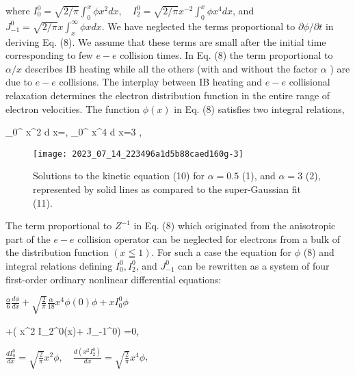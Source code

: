\documentclass[oneside,onecolumn]{article}
\begin{document}
\begin{sloppypar}
 where $I_{0}^{0}=\sqrt{2 / \pi} \int_{0}^{x} \phi x^{2} d x, \quad I_{2}^{0}=\sqrt{2 / \pi} x^{-2} \int_{0}^{x} \phi x^{4} d x$, and $J_{-1}^{0}=\sqrt{2 / \pi} x \int_{x}^{\infty} \phi x d x$. We have neglected the terms proportional to $\partial \phi / \partial t$ in deriving Eq. (8). We assume that these terms are small after the initial time corresponding to few $e-e$ collision times. In Eq. (8) the term proportional to $\alpha / x$ describes IB heating while all the others (with and without the factor $\alpha$ ) are due to $e-e$ collisions. The interplay between IB heating and $e-e$ collisional relaxation determines the electron distribution function in the entire range of electron velocities. The function $\phi(x)$ in Eq. (8) satisfies two integral relations,
 
 \int_{0}^{\infty} x^{2} \phi d x=, \quad \int_{0}^{\infty} x^{4} \phi d x=3 ,
 
 \begin{figure}[htbp]
 	\centering
 	\texttt{[image: 2023\_07\_14\_223496a1d5b88caed160g-3]}
 	\caption{Solutions to the kinetic equation (10) for $\alpha=0.5$ (1), and $\alpha=3$ (2), represented by solid lines as compared to the super-Gaussian fit (11).}
 	\label{figure1}
 \end{figure}
 
 
 The term proportional to $Z^{-1}$ in Eq. (8) which originated from the anisotropic part of the $e-e$ collision operator can be neglected for electrons from a bulk of the distribution function $(x \leqq 1)$. For such a case the equation for $\phi$ (8) and integral relations defining $I_{0}^{0}, I_{2}^{0}$, and $J_{-1}^{0}$ can be rewritten as a system of four first-order ordinary nonlinear differential equations:
 
 $\frac{\alpha}{6} \frac{d \phi}{d x}+\sqrt{\frac{2}{\pi}} \frac{\alpha}{18} x^{4} \phi(0) \phi+x I_{0}^{0} \phi$
 
 +\left( x^{2} I_{2}^{0}(x)+ J_{-1}^{0}\right) =0,
 
 $\frac{d I_{0}^{0}}{d x}=\sqrt{\frac{2}{\pi}} x^{2} \phi, \quad \frac{d\left(x^{2} I_{2}^{0}\right)}{d x}=\sqrt{\frac{2}{\pi}} x^{4} \phi$,
 

\end{sloppypar}
\end{document}
